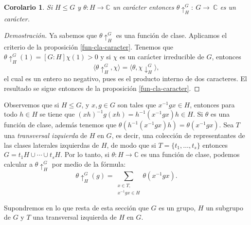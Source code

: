 \documentclass[12pt]{book}
\newtheorem{corollary}[theorem]{Corolario}
\theoremstyle{definition}
\newcounter{in}
\begin{document}
\begin{corollary}
  \label{car-inducido}
  Si $H\leq G$ y $\theta:H\rightarrow \mathbb{C}$ un carácter
  entonces $\theta\uparrow^{G}_{H}:~G\rightarrow~\mathbb{C}$ es un carácter.
\end{corollary}
\begin{proof}[Demostración]
  Ya sabemos que $\theta\uparrow^{G}_{H}$ es una función de
  clase. Aplicamos el criterio de la proposición
  \ref{fun-cla-caracter}. Tenemos que
  $\theta\uparrow^{G}_{H}(1)=[G:H]\chi(1)>0$ y si $\chi$ es un
  carácter irreducible de $G$, entonces
  \begin{equation*}
    \langle\theta\uparrow^{G}_{H},\chi\rangle=\langle\theta,\chi\downarrow^{G}_{H}\rangle,
  \end{equation*}
  el cual es un entero no negativo, pues es el producto interno de dos
  caracteres. %
  El resultado se sigue entonces de la proposición
  \ref{fun-cla-caracter}.
\end{proof}
Observemos que si $H\leq G$, y $x,g\in G$ son tales que $x^{-1}gx\in
H$, entonces para todo $h\in H$ se tiene que
$(xh)^{-1}g(xh)=h^{-1}(x^{-1}gx)h\in H$. Si $\theta$ es una función de
clase, además tenemos que
$\theta(h^{-1}(x^{-1}gx)h)=\theta(x^{-1}gx)$. Sea $T$ una \emph{transversal izquierda} de $H$ en $G$, es decir, una
colección de representantes de las clases laterales izquierdas de $H$,
de modo que si $T=\{t_{1},\ldots,t_{s}\}$ entonces
$G=t_{1}H\cup\cdots\cup t_{s}H$. Por lo tanto, si
$\theta:H\rightarrow\mathbb{C}$ es una función de clase, podemos
calcular a $\theta\uparrow^{G}_{H}$ por medio de la fórmula:
\begin{equation}
  \label{fun-ind-trans}
  \theta\uparrow^{G}_{H}(g)=\sum_{\substack{x\in T,\\x^{-1}gx\in H}}\theta(x^{-1}gx).
\end{equation}

Supondremos en lo que resta de esta sección que $G$ es un grupo, $H$ un subgrupo de
$G$  y $T$ una transversal izquierda de $H$ en $G$.
\end{document}
